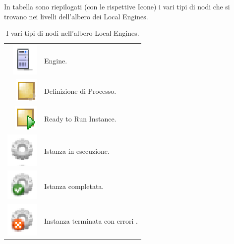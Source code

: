 In tabella sono riepilogati (con le rispettive Icone) i vari tipi di nodi che
si trovano nei livelli dell'albero dei Local Engines.

\begin{table}[hb!]
\begin{center}
\begin{tabular}{rp{}}
\includegraphics[scale=0.70]{blide/dia/server} & Engine.\\ 
\includegraphics[scale=0.70]{blide/dia/defnode} & Definizione di Processo.\\
\includegraphics[scale=0.70]{blide/dia/defnodeRun} & Ready to Run Instance.\\
\includegraphics[scale=0.70]{blide/dia/instdef} & Istanza in esecuzione.\\
\includegraphics[scale=0.70]{blide/dia/instdefok} & Istanza completata.\\
\includegraphics[scale=0.70]{blide/dia/instdefko} & Instanza terminata con
errori .\\
\end{tabular}
\caption{I vari tipi di nodi nell'albero Local Engines.}
\label{tab:bicons}
\end{center}
\end{table}

\newpage

